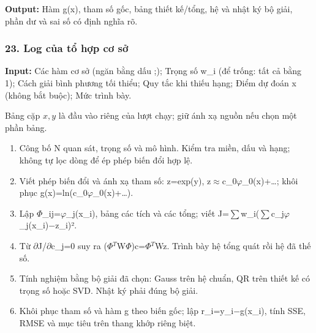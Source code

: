 \textbf{Output:} Hàm g(\allowbreak{}x),\allowbreak{} tham số gốc,\allowbreak{} bảng thiết kế/\allowbreak{}tổng,\allowbreak{} hệ và nhật ký bộ giải,\allowbreak{} phần dư và sai số có định nghĩa rõ.

\examplebreak\subsubsection*{23. Log của tổ hợp cơ sở}

\textbf{Input:} Các hàm cơ sở (\allowbreak{}ngăn bằng dấu ;\allowbreak{});\allowbreak{} Trọng số w\_i (\allowbreak{}để trống: tất cả bằng 1);\allowbreak{} Cách giải bình phương tối thiểu;\allowbreak{} Quy tắc khi thiếu hạng;\allowbreak{} Điểm dự đoán x (\allowbreak{}không bắt buộc);\allowbreak{} Mức trình bày.

Bảng cặp $x,y$ là đầu vào riêng của lượt chạy; giữ ánh xạ nguồn nếu chọn một phần bảng.

\begin{enumerate}

\item Công bố N quan sát,\allowbreak{} trọng số và mô hình. Kiểm tra miền,\allowbreak{} dấu và hạng;\allowbreak{} không tự lọc dòng để ép phép biến đổi hợp lệ.

\item Viết phép biến đổi và ánh xạ tham số: z=\allowbreak{}exp(\allowbreak{}y),\allowbreak{} z\ensuremath{\approx}c\_0\ensuremath{\varphi}\_0(\allowbreak{}x)+\allowbreak{}…;\allowbreak{} khôi phục g(\allowbreak{}x)=\allowbreak{}ln(\allowbreak{}c\_0\ensuremath{\varphi}\_0(\allowbreak{}x)+\allowbreak{}…).

\item Lập \ensuremath{\Phi}\_ij=\allowbreak{}\ensuremath{\varphi}\_j(\allowbreak{}x\_i),\allowbreak{} bảng các tích và các tổng;\allowbreak{} viết J=\allowbreak{}\ensuremath{\sum}w\_i(\allowbreak{}\ensuremath{\sum}c\_j\ensuremath{\varphi}\_j(\allowbreak{}x\_i)\ensuremath{-}z\_i)².

\item Từ \ensuremath{\partial}J/\allowbreak{}\ensuremath{\partial}c\_j=\allowbreak{}0 suy ra (\allowbreak{}\ensuremath{\Phi}\ensuremath{{}^T}W\ensuremath{\Phi})c=\allowbreak{}\ensuremath{\Phi}\ensuremath{{}^T}Wz. Trình bày hệ tổng quát rồi hệ đã thế số.

\item Tính nghiệm bằng bộ giải đã chọn: Gauss trên hệ chuẩn,\allowbreak{} QR trên thiết kế có trọng số hoặc SVD. Nhật ký phải đúng bộ giải.

\item Khôi phục tham số và hàm g theo biến gốc;\allowbreak{} lập r\_i=\allowbreak{}y\_i\ensuremath{-}g(\allowbreak{}x\_i),\allowbreak{} tính SSE,\allowbreak{} RMSE và mục tiêu trên thang khớp riêng biệt.

\end{enumerate}

